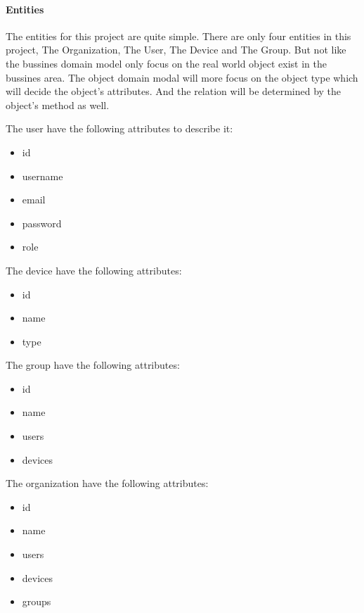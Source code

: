 \paragraph{Entities}
The entities for this project are quite simple. There are only four entities in this project, The Organization, The User, The Device and The Group.
But not like the bussines domain model only focus on the real world object exist in the bussines area. 
The object domain modal will more focus on the object type which will decide the object's attributes. 
And the relation will be determined by the object's method as well.

The user have the following attributes to describe it:
\begin{itemize}
    \item id
    \item username
    \item email
    \item password
    \item role
\end{itemize}

The device have the following attributes:
\begin{itemize}
    \item id
    \item name
    \item type
\end{itemize}

The group have the following attributes:
\begin{itemize}
    \item id
    \item name
    \item users
    \item devices
\end{itemize}

The organization have the following attributes:
\begin{itemize}
    \item id
    \item name
    \item users
    \item devices
    \item groups
\end{itemize}
